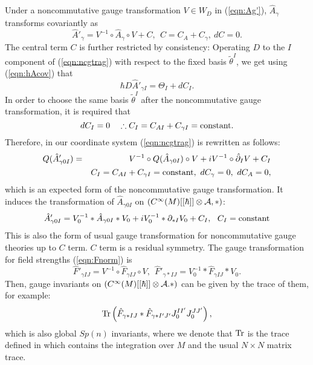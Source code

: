 \documentclass[10pt,a4paper]{article}
\def\h{\hbar}
\def\hA{{\hat A}}
\begin{document}
Under a noncommutative gauge transformation $V\in W_D$ in (\ref{eqn:Ag'}), $\hA_\gamma$ transforms covariantly as
\begin{equation}
\label{eqn:ncgtrag}
\hA'_\gamma=V^{-1}\circ \hA_\gamma\circ V+C,\ \ C=C_A+C_\gamma,\ dC=0.
\end{equation}
The central term $C$ is further restricted by consistency: 
Operating $D$ to the $I$ component of (\ref{eqn:ncgtrag}) with respect to the fixed basis ${\tilde \theta}^I$, we get using (\ref{eqn:hAcov}) that
\begin{equation}
\h D\hA'_{\gamma I}=\Theta_I+dC_I.
\end{equation}
In order to choose the same basis ${\tilde \theta}^I$ after the noncommutative gauge transformation, it is required that
\begin{equation}
dC_I=0\ \ \ \therefore C_I=C_{AI}+C_{\gamma I}={\rm constant}.
\end{equation}
Therefore, in our coordinate system (\ref{eqn:ncgtrag}) is rewritten as follows:
\begin{eqnarray}
\label{eqn:gengtr}
Q(\hA'_{\gamma0I})&=&V^{-1}\circ Q(\hA_{\gamma0I})\circ V+iV^{-1}\circ {\hat \partial}_IV+C_I\nonumber\\
&&C_I= C_{AI}+C_{\gamma I}={\rm constant},\ dC_\gamma=0,\ dC_A=0,
\end{eqnarray}
which is an expected form of the noncommutative gauge transformation. It induces the transformation of $\hA_{\gamma0I}$ on $(C^\infty(M)[[\h]]\otimes {\cal A},*)$:
\begin{equation}
\label{eqn:gengtry}
\hA'_{\gamma0I}=V_0^{-1}*\hA_{\gamma0I}*V_0+iV_0^{-1}*\partial_{*I}V_0+C_I,\ \ 
C_I={\rm constant}
\end{equation}
This is also the form of usual gauge transformation for noncommutative gauge theories up to $C$ term. $C$ term is a residual symmetry.
The gauge transformation for field strengths (\ref{eqn:Fnorm}) is
\begin{equation}
{\hat F}'_{\gamma IJ}=V^{-1}\circ {\hat F}_{\gamma IJ}\circ V,
\ \ {\hat F}'_{\gamma*IJ}=V_0^{-1}*{\hat F}_{\gamma IJ}*V_0.
\end{equation}
Then, gauge invariants on $(C^\infty(M)[[\h]]\otimes {\cal A}.*)$ can be given by the trace of them, for example:
\begin{equation}
{\rm Tr}\left({\hat F}_{\gamma*IJ}*{\hat F}_{\gamma*I'J'}J_0^{II'}J_0^{JJ'}\right),
\end{equation}
which is also global $Sp(n)$ invariants, where we denote that ${\rm Tr}$ is the trace defined in \cite{Fed}\cite{Fedbk} which contains the integration over $M$ and the usual $N\times N$ matrix trace. 
\end{document}
